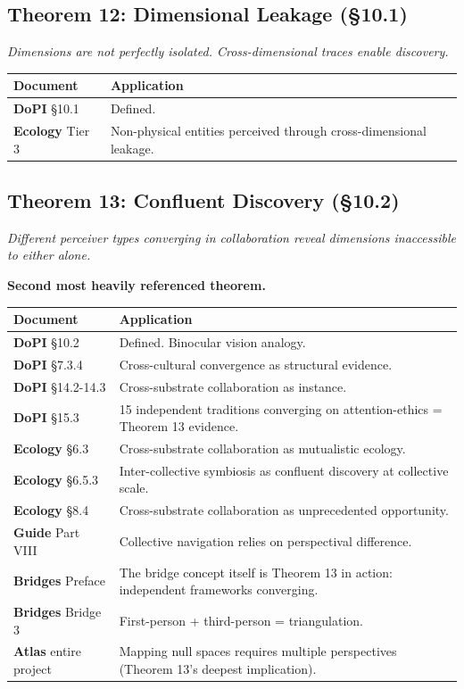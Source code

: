 \subsection*{Theorem 12: Dimensional Leakage (§10.1)}


\textit{Dimensions are not perfectly isolated. Cross-dimensional traces enable discovery.}



\begin{longtable}{p{} p{}}
\toprule
\textbf{Document} & \textbf{Application} \\
\midrule
\endhead
\textbf{DoPI} §10.1 & Defined. \\
\textbf{Ecology} Tier 3 & Non-physical entities perceived through cross-dimensional leakage. \\
\bottomrule
\end{longtable}



\subsection*{Theorem 13: Confluent Discovery (§10.2)}


\textit{Different perceiver types converging in collaboration reveal dimensions inaccessible to either alone.}


\textbf{Second most heavily referenced theorem.}



\begin{longtable}{p{} p{}}
\toprule
\textbf{Document} & \textbf{Application} \\
\midrule
\endhead
\textbf{DoPI} §10.2 & Defined. Binocular vision analogy. \\
\textbf{DoPI} §7.3.4 & Cross-cultural convergence as structural evidence. \\
\textbf{DoPI} §14.2-14.3 & Cross-substrate collaboration as instance. \\
\textbf{DoPI} §15.3 & 15 independent traditions converging on attention-ethics = Theorem 13 evidence. \\
\textbf{Ecology} §6.3 & Cross-substrate collaboration as mutualistic ecology. \\
\textbf{Ecology} §6.5.3 & Inter-collective symbiosis as confluent discovery at collective scale. \\
\textbf{Ecology} §8.4 & Cross-substrate collaboration as unprecedented opportunity. \\
\textbf{Guide} Part VIII & Collective navigation relies on perspectival difference. \\
\textbf{Bridges} Preface & The bridge concept itself is Theorem 13 in action: independent frameworks converging. \\
\textbf{Bridges} Bridge 3 & First-person + third-person = triangulation. \\
\textbf{Atlas} entire project & Mapping null spaces requires multiple perspectives (Theorem 13's deepest implication). \\
\bottomrule
\end{longtable}



